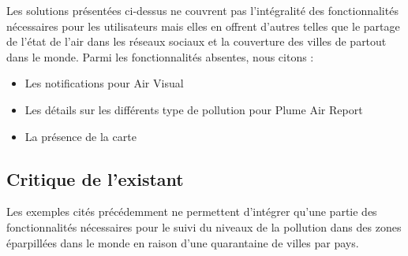\qquad Les solutions présentées ci-dessus ne couvrent pas l'intégralité des fonctionnalités nécessaires pour les utilisateurs mais elles en offrent d'autres telles que le partage de l'état de l'air dans les réseaux sociaux et la couverture des villes de partout dans le monde. Parmi les fonctionnalités absentes, nous citons :
\begin{itemize}
	\item Les notifications pour Air Visual
	\item Les détails sur les différents type de pollution pour Plume Air Report
	\item La présence de la carte
\end{itemize} 

\subsection{Critique de l'existant}

\qquad Les exemples cités précédemment ne permettent d'intégrer qu'une partie des fonctionnalités nécessaires pour le suivi du niveaux de la pollution dans des zones éparpillées dans le monde en raison d'une quarantaine de villes par pays.    